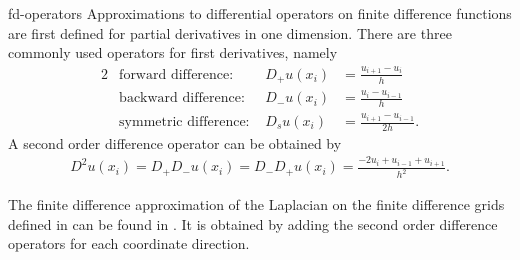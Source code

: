 \begin{Definition}{fd-operators}
  Approximations to differential operators on finite difference
  functions are first defined for partial derivatives in one
  dimension. There are three commonly used operators for first
  derivatives, namely
  \begin{alignat}2
    &\text{forward difference: } & D_+ u(x_i) &= \frac{u_{i+1} - u_{i}}{h}\\
    &\text{backward difference: } & D_- u(x_i) &= \frac{u_{i} - u_{i-1}}{h}\\
    &\text{symmetric difference: } & D_s u(x_i) &= \frac{u_{i+1} - u_{i-1}}{2h}.
  \end{alignat}
  A second order difference operator can be obtained by
  \begin{gather}
    D^2u(x_i) = D_+D_-u(x_i) = D_-D_+u(x_i) = \frac{-2u_i + u_{i-1}+u_{i+1}}{h^2}.
  \end{gather}
\end{Definition}

\begin{remark}
  The finite difference approximation of the Laplacian on the finite
  difference grids defined in  can be
  found in . It is obtained by
  adding the second order difference operators for each coordinate
  direction.
\end{remark}

